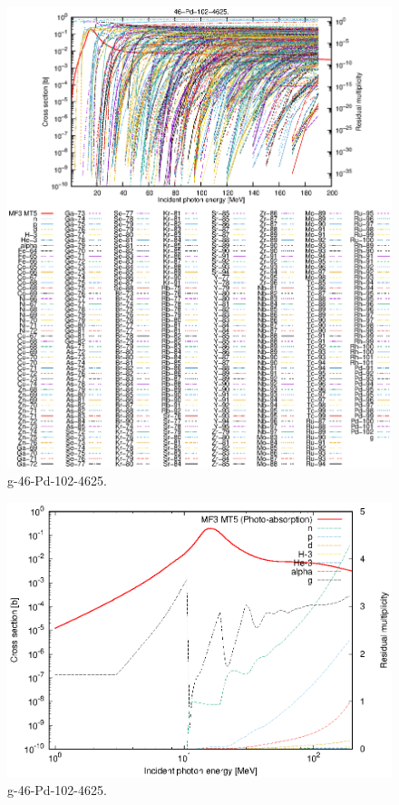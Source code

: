 \begin{figure}
 \includegraphics[width=\linewidth]{eps/g_46-Pd-102_4625.eps}
  \caption{g-46-Pd-102-4625.}
\end{figure}
\newpage \clearpage

\begin{figure}
 \includegraphics[width=\linewidth]{eps-log/g_46-Pd-102_4625.eps}
 \caption{g-46-Pd-102-4625.}
\end{figure}
\newpage \clearpage

